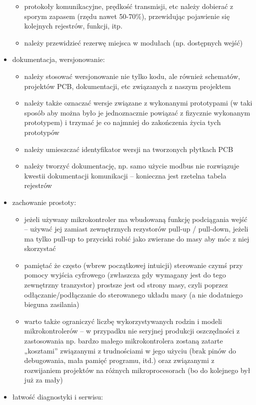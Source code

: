 \begin{itemize}
\begin{itemize}
			\item protokoły komunikacyjne, prędkość transmisji, etc należy dobierać z sporym zapasem (rzędu nawet 50-70\%), przewidując pojawienie się kolejnych rejestrów, funkcji, itp.
			\item należy przewidzieć rezerwę miejsca w modułach (np. dostępnych wejść)
		\end{itemize}
	\item dokumentacja, wersjonowanie:
		\begin{itemize}
			\item należy stosować wersjonowanie nie tylko kodu, ale również schematów, projektów PCB, dokumentacji, etc związanych z naszym projektem
			\item należy także oznaczać wersje związane z wykonanymi prototypami (w taki sposób aby można było je jednoznacznie powiązać z fizycznie wykonanym prototypem) i trzymać je co najmniej do zakończenia życia tych prototypów
			\item należy umieszczać identyfikator wersji na tworzonych płytkach PCB
			\item należy tworzyć dokumentację, np. samo użycie modbus nie rozwiązuje kwestii dokumentacji komunikacji – konieczna jest rzetelna tabela rejestrów
		\end{itemize}
	\item zachowanie prostoty:
		\begin{itemize}
			\item jeżeli używany mikrokontroler ma wbudowaną funkcję podciągania wejść – używać jej zamiast zewnętrznych rezystorów pull-up / pull-down,
				jeżeli ma tylko pull-up to przyciski robić jako zwierane do masy aby móc z niej skorzystać
			\item pamiętać że często (wbrew początkowej intuicji) sterowanie czymś przy pomocy wyjścia cyfrowego (zwłaszcza gdy wymagany jest do tego zewnętrzny tranzystor) prostsze jest od strony masy,
				czyli poprzez odłączanie/podłączanie do sterowanego układu masy (a nie dodatniego bieguna zasilania)
			\item warto także ograniczyć liczbę wykorzystywanych rodzin i modeli mikrokontrolerów
				– w przypadku nie seryjnej produkcji oszczędności z zastosowania np. bardzo małego mikrokontrolera zostaną zatarte „kosztami” związanymi z trudnościami w jego użyciu (brak pinów do debugowania, mała pamięć programu, itd.)
				oraz związanymi z rozwijaniem projektów na różnych mikroprocesorach (bo do kolejnego był już za mały)
		\end{itemize}
	\item łatwość diagnostyki i serwisu:

\end{itemize}
